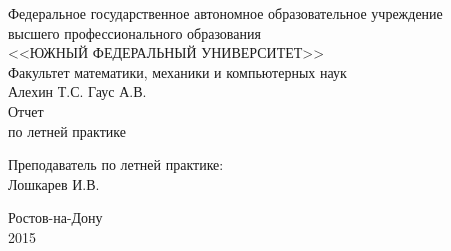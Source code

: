 \begin{titlepage}
\begin{center}
	Федеральное государственное автономное образовательное учреждение\\
	высшего профессионального образования\\
	\MakeUppercase{<<ЮЖНЫЙ ФЕДЕРАЛЬНЫЙ УНИВЕРСИТЕТ>>}\\[1cm]
	Факультет математики, механики и компьютерных наук\\[1cm]
	\vspace*{\fill}
	{\LARGE Алехин Т.С. Гаус А.В.\\Отчет\\по летней практике}
	\vspace*{\fill}
\begin{flushright}
	Преподаватель по летней практике:\\ Лошкарев И.В.
\end{flushright}
	\vspace*{\fill}
	Ростов-на-Дону\\
	2015
\end{center}
\end{titlepage}
